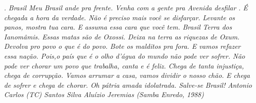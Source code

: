 \begin{epigrafe}
    \vspace*{\fill}
	\begin{flushright}\textit{. Brasil Meu Brasil ande pra frente. Venha com a gente pra Avenida desfilar . \'E chegada a hora da verdade. N\~ao \'e preciso mais voc\^e se disfar\c{c}ar. Levante os panos, mostra tua cara. E assuma essa cara que voc\^e tem. Brasil Terra dos Ianom\^amis. Essas matas s\~ao de Oxossi. Deixa na terra as riquezas de Oxum. Devolva pro povo o que \'e do povo. Bote os malditos pra fora. E vamos refazer essa na\c{c}\~ao. Pois,o pa\'{i}s que  \'e o olho d’\'agua do mundo n\~ao pode ver sofrer. N\~ao pode ver chorar um povo que trabalha, canta e \'e feliz. Chega de tanta injusti\c{c}a, chega de corrup\c{c}\~ao. Vamos arrumar a casa, vamos dividir o nosso ch\~ao. E chega de sofrer e chega de chorar. Oh p\'atria amada idolatrada. Salve-se Brasil! Antonio Carlos (TC) Santos Silva Alu\'{i}zio Jeremias (Samba Enredo, 1988)}
	\end{flushright}
\end{epigrafe}
